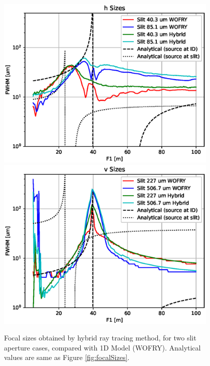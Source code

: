 \documentclass{iucr}              %
\begin{document}
\begin{figure}
    \centering

    \includegraphics[width=0.95\textwidth]{figures/sizes_h_hybrid.eps}
    \includegraphics[width=0.95\textwidth]{figures/sizes_v_hybrid.eps}
        
    \caption{Focal sizes obtained by hybrid ray tracing method, for two slit aperture cases, compared with 1D Model (WOFRY). Analytical values are same as Figure \ref{fig:focalSizes}. 
    }
    \label{fig:focalSizes_hybrid}
\end{figure}

\end{document}

